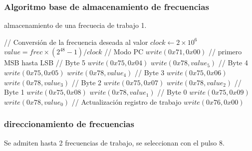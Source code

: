 \subsubsection{Algoritmo base de almacenamiento de frecuencias}
\begin{algorithm}[H]
    \caption{almacenamiento de una frecuecia de trabajo 1.}\label{algo_frec}
    \begin{algorithmic}[1]
    \State // {Conversi\'on de la frecuencia deseada al valor}
    \State $clock \gets 2 \times 10^{6}$
    \State $value = frec \times (2^{48} -1 ) / clock $
    \State // {Modo PC}
    \State $write(0x71, 0x00)$
    \State // {primero MSB hasta LSB}
    \State // {Byte 5}
    \State $write(0x75, 0x04)$ 
    \State $write(0x78, value_5)$
    \State // {Byte 4}
    \State $write(0x75, 0x05)$ 
    \State $write(0x78, value_4)$
    \State // {Byte 3}
    \State $write(0x75, 0x06)$ 
    \State $write(0x78, value_3)$
    \State // {Byte 2}
    \State $write(0x75, 0x07)$ 
    \State $write(0x78, value_2)$
    \State // {Byte 1}
    \State $write(0x75, 0x08)$ 
    \State $write(0x78, value_1)$
    \State // {Byte 0}
    \State $write(0x75, 0x09)$ 
    \State $write(0x78, value_0)$
    \State // {Actualizaci\'on registro de trabajo}
    \State $write(0x76, 0x00)$
    \EndProcedure
    \end{algorithmic}
\end{algorithm}

\subsubsection{direccionamiento de frecuencias}
Se admiten hasta 2 frecuencias de trabajo, se seleccionan con el pulso 8.

\newpage
